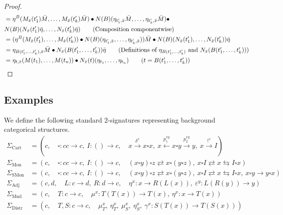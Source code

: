 \begin{proof}
{\begin{align*}
   &=\eta^B(M_{\bar{x}}(t_1')\bar{M},\ldots, M_{\bar{x}}(t_k')\bar{M})\bullet
   N(B)(\eta_{t_1',\bar{x}}\bar{M},\ldots, \eta_{t_k',\bar{x}}\bar{M})\bullet\\
   & N(B)(N_{\bar{x}}(t_1')\bar{\eta},\ldots, N_{\bar{x}}(t_k')\bar{\eta}) \tag{Composition componentwise}\\
   &= (\eta^B(M_{\bar{x}}(t_1'),\ldots, M_{\bar{x}}(t_k'))\bullet
   N(B)(\eta_{t_1',\bar{x}},\ldots, \eta_{t_k',\bar{x}}))\bar{M} \bullet
    N(B)(N_{\bar{x}}(t_1'),\ldots, N_{\bar{x}}(t_k'))\bar{\eta} \\
   &= \eta_{B(t_1',\ldots, t_k'),\bar{x}}\bar{M}\bullet N_{\bar{x}}(B(t_1',\ldots, t_k'))\bar{\eta}\tag{Definitions of $\eta_{B(t_1',\ldots, t_k')}$ and $N_{\bar{x}}(B(t_1',\ldots, t_k'))$}\\
   &=\eta_{t,\bar{x}}(M(t_1),\ldots, M(t_n))\bullet N_{\bar{x}}(t)(\eta_{t_1},\ldots, \eta_{t_n})\tag{$t = B(t_1',\ldots, t_k')$}
\end{align*}
}
\end{proof}

\subsection{Examples}

\begin{examples}\label{ex:2-signatures}
   We define the following standard $2$-signatures representing background categorical structures.
   {\small
   \begin{align*}
       \Sigma_{\text{Cart}}
    &= (c,\quad \square\colon cc\to c,\ I\colon ()\to c,
    \quad x\xrightarrow{\delta^x}x\square x, \ x\xleftarrow{p_1^{xy}}x\square y\xrightarrow{p_2^{xy}}y,\ x\xrightarrow{!^x}I)\\
       \Sigma_{\text{Mon}}
       &= (c,\quad \square\colon cc\to c,\  I\colon ()\to c,\quad (x\square y)\square z\rightleftarrows x\square (y\square z),\ x\square I\rightleftarrows x\leftrightarrows I\square x)\\
       \Sigma_{\text{SMon}}
       &= (c,\quad \square\colon cc\to c,\ I\colon ()\to c,\quad (x\square y)\square z\rightleftarrows x\square (y\square z),\  x\square I\rightleftarrows x\leftrightarrows I\square x,\ x\square y\to y\square x)\\
       \Sigma_{\text{Adj}}
       &= (c,d,\quad L\colon c\to d,\ R\colon d\to c,\quad \eta^x\colon x\to R(L(x)),\ \varepsilon^y\colon L(R(y))\to y)\\
       \Sigma_{\text{Mnd}}
       &= (c,\quad T\colon c\to c,\quad \mu^x\colon T(T(x))\to T(x),\ \eta^x\colon x\to T(x))\\
       \Sigma_{\text{Distr}}
       &= (c,\quad T,S\colon c\to c,\quad  \mu_T^x,\ \eta_T^x,\ \mu_S^x,\ \eta_S^x,\ \gamma^x\colon S(T(x))\to T(S(x)))
   \end{align*}
   }
\end{examples}

